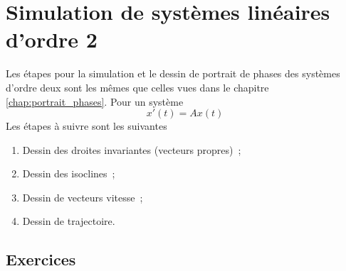     \section{Simulation de systèmes linéaires d'ordre 2}
        Les étapes pour la simulation et le dessin de portrait de phases des systèmes d'ordre deux sont les mêmes que celles vues dans le chapitre \ref{chap:portrait_phases}. Pour un système
        \begin{equation*}
            x'(t) = A x(t)
        \end{equation*}
        Les étapes à suivre sont les suivantes
        \begin{enumerate}
            \item Dessin des droites invariantes (vecteurs propres)~;
            \item Dessin des isoclines~;
            \item Dessin de vecteurs vitesse~;
            \item Dessin de trajectoire.
        \end{enumerate}
        \subsection{Exercices}
